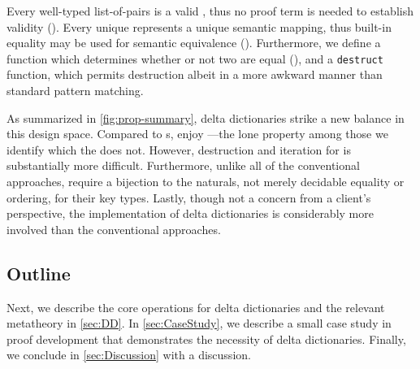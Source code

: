 \vsepRule

Every well-typed list-of-pairs is a valid \dd{}, thus no proof term is needed to establish validity (\SemTot).
%
Every unique \dd{} represents a unique semantic mapping, thus built-in equality may be used for semantic equivalence (\SemInj).
%
%
Furthermore, we define a function which determines whether or not two \dds{} are equal (\EqDec), and a \texttt{destruct} function, which permits destruction albeit in a more awkward manner than standard pattern matching.

As summarized in \autoref{fig:prop-summary}, delta dictionaries strike a new balance in this design space.
%
Compared to \cal{}s, \dds{} enjoy \SemTot{}---the lone property among those we identify which the \cal{} does not.
%
However, destruction and iteration for \dds{} is substantially more difficult.
%
Furthermore, unlike all of the conventional approaches, \dds{} require a bijection to the naturals, not merely decidable equality or ordering, for their key types.
%
%
Lastly, though not a concern from a client's perspective, the implementation of delta dictionaries is considerably more involved than the conventional approaches.





\subsection{Outline}
%
%
Next, we describe the core operations for delta dictionaries and the relevant metatheory in \autoref{sec:DD}.
%
In \autoref{sec:CaseStudy}, we describe a small case study in proof development that demonstrates the necessity of delta dictionaries.
%
Finally, we conclude in \autoref{sec:Discussion} with a discussion. %
%


